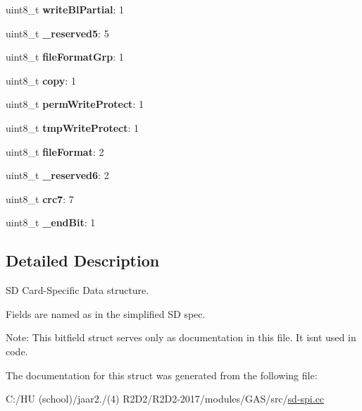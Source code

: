 \begin{DoxyCompactItemize}
uint8\+\_\+t {\bfseries write\+Bl\+Partial}\+: 1
\item 
\mbox{\label{struct_sd_csd_adfc80945cd5e7b5785a45349b1f2036c}} 
uint8\+\_\+t {\bfseries \+\_\+reserved5}\+: 5
\item 
\mbox{\label{struct_sd_csd_ada3bdf7a3821b09329407a7c872bcdb2}} 
uint8\+\_\+t {\bfseries file\+Format\+Grp}\+: 1
\item 
\mbox{\label{struct_sd_csd_a339fdc61e0628a61d83fd75e8e383cd8}} 
uint8\+\_\+t {\bfseries copy}\+: 1
\item 
\mbox{\label{struct_sd_csd_a4f833463f25d4e572bff2922061c5bd4}} 
uint8\+\_\+t {\bfseries perm\+Write\+Protect}\+: 1
\item 
\mbox{\label{struct_sd_csd_a544fbf58619407e50c16e725ea93a858}} 
uint8\+\_\+t {\bfseries tmp\+Write\+Protect}\+: 1
\item 
\mbox{\label{struct_sd_csd_abd1d77966aa79bb40691ed2b41d6d5e3}} 
uint8\+\_\+t {\bfseries file\+Format}\+: 2
\item 
\mbox{\label{struct_sd_csd_aff4c075422b25c3b28ee8b9dc7908f14}} 
uint8\+\_\+t {\bfseries \+\_\+reserved6}\+: 2
\item 
\mbox{\label{struct_sd_csd_ab4f8645c6177af04bb5fc38a7d23fac3}} 
uint8\+\_\+t {\bfseries crc7}\+: 7
\item 
\mbox{\label{struct_sd_csd_a9aa65519352646ed14338ab0cc064362}} 
uint8\+\_\+t {\bfseries \+\_\+end\+Bit}\+: 1
\end{DoxyCompactItemize}


\subsection{Detailed Description}
SD Card-\/\+Specific Data structure. 

Fields are named as in the simplified SD spec.

Note\+: This bitfield struct serves only as documentation in this file. It isn\textquotesingle{}t used in code. 

The documentation for this struct was generated from the following file\+:\begin{DoxyCompactItemize}
\item 
C\+:/\+H\+U (school)/jaar2./(4) R2\+D2/\+R2\+D2-\/2017/modules/\+G\+A\+S/src/\hyperlink{sd-spi_8cc}{sd-\/spi.\+cc}\end{DoxyCompactItemize}
